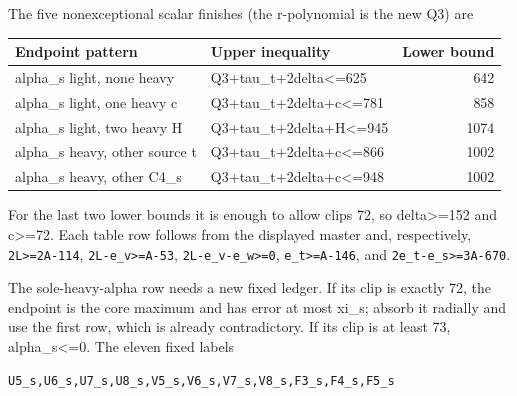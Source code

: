 \documentclass[10pt,a4paper]{article}
\theoremstyle{definition}
\begin{document}
The five nonexceptional scalar finishes (the r-polynomial is the new Q3)
are

\begin{longtable}[]{@{}llr@{}}
\toprule\noalign{}
Endpoint pattern & Upper inequality & Lower bound \\
\midrule\noalign{}
\endhead
\bottomrule\noalign{}
\endlastfoot
alpha\_\allowbreak{}s light,\allowbreak{} none heavy & Q3+\allowbreak{}tau\_\allowbreak{}t+\allowbreak{}2delta\textless=\allowbreak{}625 & 642 \\
alpha\_\allowbreak{}s light,\allowbreak{} one heavy c & Q3+\allowbreak{}tau\_\allowbreak{}t+\allowbreak{}2delta+\allowbreak{}c\textless=\allowbreak{}781 & 858 \\
alpha\_\allowbreak{}s light,\allowbreak{} two heavy H & Q3+\allowbreak{}tau\_\allowbreak{}t+\allowbreak{}2delta+\allowbreak{}H\textless=\allowbreak{}945 & 1074 \\
alpha\_\allowbreak{}s heavy,\allowbreak{} other source t & Q3+\allowbreak{}tau\_\allowbreak{}t+\allowbreak{}2delta+\allowbreak{}c\textless=\allowbreak{}866 &
1002 \\
alpha\_\allowbreak{}s heavy,\allowbreak{} other C4\_\allowbreak{}s & Q3+\allowbreak{}tau\_\allowbreak{}t+\allowbreak{}2delta+\allowbreak{}c\textless=\allowbreak{}948 & 1002 \\
\end{longtable}

For the last two lower bounds it is enough to allow clips 72,\allowbreak{} so
delta\textgreater=\allowbreak{}152 and c\textgreater=\allowbreak{}72. Each table row follows from
the displayed master and,\allowbreak{} respectively,\allowbreak{}
\texttt{2L>=\allowbreak{}2A-114},\allowbreak{}
\texttt{2L-e\_\allowbreak{}\allowbreak{}v>=\allowbreak{}A-53},\allowbreak{}
\texttt{2L-e\_\allowbreak{}\allowbreak{}v-e\_\allowbreak{}\allowbreak{}w>=\allowbreak{}0},\allowbreak{}
\texttt{e\_\allowbreak{}\allowbreak{}t>=\allowbreak{}A-146},\allowbreak{} and
\texttt{2e\_\allowbreak{}\allowbreak{}t-e\_\allowbreak{}\allowbreak{}s>=\allowbreak{}3A-670}.

The sole-heavy-alpha row needs a new fixed ledger. If its clip is
exactly 72,\allowbreak{} the endpoint is the core maximum and has error at most
xi\_\allowbreak{}s; absorb it radially and use the first row,\allowbreak{} which is already
contradictory. If its clip is at least 73,\allowbreak{} alpha\_\allowbreak{}s\textless=\allowbreak{}0. The
eleven fixed labels

\begin{lstlisting}
U5_s,U6_s,U7_s,U8_s,V5_s,V6_s,V7_s,V8_s,F3_s,F4_s,F5_s
\end{lstlisting}
\end{document}

